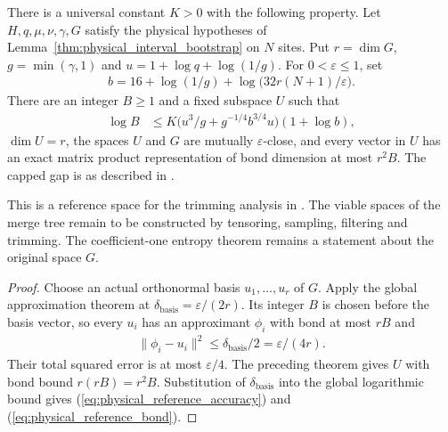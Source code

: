 \begin{lemma}
    \label{thm:physical_dg_mps_reference_subspace}
    \leanok
    There is a universal constant $K>0$ with the following property.
    Let $H,q,\mu,\nu,\gamma,G$ satisfy the physical hypotheses of
    Lemma~\ref{thm:physical_interval_bootstrap} on $N$ sites.
    Put $r=\dim G$, $g=\min(\gamma,1)$ and $u=1+\log q+\log(1/g)$.
    For $0<\varepsilon\le1$, set
    \begin{align}
        b=16+\log(1/g)+\log\bigl(32r(N+1)/\varepsilon\bigr).
        \label{eq:physical_reference_accuracy}
    \end{align}
    There are an integer $B\ge1$ and a fixed subspace $U$ such that
    \begin{align}
        \log B & \le K\bigl(u^3/g+g^{-1/4}b^{3/4}u\bigr)(1+\log b),
        \label{eq:physical_reference_bond}
    \end{align}
    $\dim U=r$, the spaces $U$ and $G$ are mutually $\varepsilon$-close,
    and every vector in $U$ has an exact matrix product representation of
    bond dimension at most $r^2B$.
    The capped gap is as described in
    \cite{gap:alvv16_approximation_parameters}.

    This is a reference space for the trimming analysis in
    \cite[proof for degenerate ground spaces, lines 1801--1805]{Arad2016RigorousRG}.
    The viable spaces of the merge tree remain to be constructed by
    tensoring, sampling, filtering and trimming. The coefficient-one
    entropy theorem remains a statement about the original space $G$.
\end{lemma}
\begin{proof}
    \leanok
    Choose an actual orthonormal basis $u_1,\ldots,u_r$ of $G$.
    Apply the global approximation theorem at
    $\delta_{\mathrm{basis}}=\varepsilon/(2r)$.
    Its integer $B$ is chosen before the basis vector, so every $u_i$ has
    an approximant $\phi_i$ with bond at most $rB$ and
    \begin{align*}
        \|\phi_i-u_i\|^2\le\delta_{\mathrm{basis}}/2
        =\varepsilon/(4r).
    \end{align*}
    Their total squared error is at most $\varepsilon/4$.
    The preceding theorem gives $U$ with bond bound $r(rB)=r^2B$.
    Substitution of $\delta_{\mathrm{basis}}$ into the global logarithmic
    bound gives (\ref{eq:physical_reference_accuracy}) and
    (\ref{eq:physical_reference_bond}).
\end{proof}



